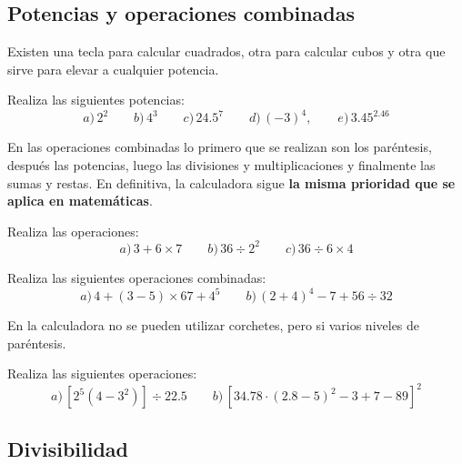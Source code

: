 \documentclass[12pt]{article}
\newenvironment{capitulo}{\begin{tcolorbox}[colback=blue!5!white,colframe=red!75!black]}{\end{tcolorbox}\bigskip}
\newenvironment{ejer}{\begin{tcolorbox}[center title, 
fonttitle=\sffamily\bfseries,colback=blue!5,colframe=orange]}{\end{tcolorbox}}
\begin{document}
\newpage
\begin{capitulo}
\section*{Potencias y operaciones combinadas}
\end{capitulo}

Existen una tecla para calcular cuadrados, otra para calcular cubos y otra que sirve para elevar a cualquier potencia.

\begin{ejer}

Realiza las siguientes potencias:
\[
a)\, 2^2 \qquad b)\, 4^3 \qquad c)\, 24.5^{7} \qquad d) \,(-3)^4, \qquad e)\, 3.45^{2.46}
\]

\end{ejer}

En las operaciones combinadas lo primero que se realizan son los paréntesis, después las potencias, luego las divisiones y multiplicaciones y finalmente las sumas y restas. En definitiva, la calculadora sigue \textbf{la misma prioridad que se aplica en matemáticas}.

\begin{ejer}

Realiza las operaciones:
\[
a)\, 3+6\times 7 \qquad b)\, 36 \div 2^2 \qquad c)\, 
36 \div 6 \times 4
\]

\end{ejer}

\begin{ejer}

Realiza las siguientes operaciones combinadas:
\[
a) \, 4+(3-5)\times 67 +4^5 \qquad b)\, (2+4)^4-7+ 56\div 32
\]
\end{ejer}

En la calculadora no se pueden utilizar corchetes, pero si varios niveles de paréntesis.

\begin{ejer}
Realiza las siguientes operaciones:
\[
a)\,\left[2^5\left(4-3^2\right)\right] \div 22.5 \qquad b)\,
\left[34.78 \cdot \left(2.8-5\right)^2-3+7-89\right]^2
\]

\end{ejer}

\newpage

\begin{capitulo}
\section*{Divisibilidad}
\end{capitulo}
\end{document}

